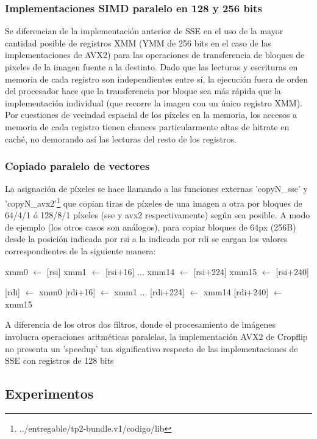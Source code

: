 \subsubsection{Implementaciones SIMD paralelo en 128 y 256 bits}
Se diferencian de la implementación anterior de SSE en el uso de la mayor cantidad posible de registros XMM (YMM de 256 bits en el caso de las implementaciones de AVX2) para las operaciones de transferencia de bloques de pixeles de la imagen fuente a la destinto. 
Dado que las lecturas y escrituras en memoria de cada registro son independientes entre sí, la ejecución fuera de orden del procesador hace que la transferencia por bloque sea más rápida que la implementación individual (que recorre la imagen con un único registro XMM). Por cuestiones de vecindad espacial de los píxeles en la memoria, los accesos a memoria de cada registro tienen chances particularmente altas de hitrate en caché, no demorando así las lecturas del resto de los registros.

\subsubsection{Copiado paralelo de vectores}

La asignación de píxeles se hace llamando a las funciones externas 'copyN_sse' y 'copyN_avx2'\footnote{../entregable/tp2-bundle.v1/codigo/lib} que copian tiras de píxeles de una imagen a otra por bloques de 64/4/1 ó 128/8/1 píxeles (sse y avx2 respectivamente) según sea posible. A modo de ejemplo (los otros casos son análogos), para copiar bloques de 64px (256B) desde la posición indicada por rsi a la indicada por rdi se cargan los valores correspondientes de la siguiente manera:


xmm0 $\leftarrow$ [rsi]
xmm1 $\leftarrow$ [rsi+16]
...
xmm14 $\leftarrow$ [rsi+224]
xmm15 $\leftarrow$ [rsi+240]

[rdi] $\leftarrow$ xmm0
[rdi+16] $\leftarrow$ xmm1
...
[rdi+224] $\leftarrow$ xmm14
[rdi+240] $\leftarrow$ xmm15   


A diferencia de los otros dos filtros, donde el procesamiento de imágenes involucra operaciones aritméticas paralelas, la implementación AVX2 de Cropflip no presenta un 'speedup' tan significativo respecto de las implementaciones de SSE con registros de 128 bits




\subsection{Experimentos}

